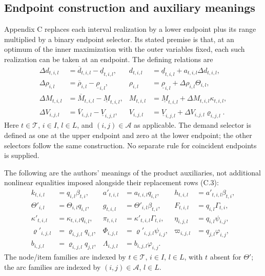 \documentclass{article}
\begin{document}
\subsection*{Endpoint construction and auxiliary meanings}
Appendix C replaces each interval realization by a lower endpoint plus its range
multiplied by a binary endpoint selector. Its stated premise is that, at an optimum
of the inner maximization with the outer variables fixed, each such realization can
be taken at an endpoint. The defining relations are
\begin{align*}
\Delta d_{t,i,l}&=\overline d_{t,i,l}-\underline d_{t,i,l},&
d_{t,i,l}&=\underline d_{t,i,l}+a_{t,i,l}\Delta d_{t,i,l},\\
\Delta\rho_{i,l}&=\overline\rho_{i,l}-\underline\rho_{i,l},&
\rho_{i,l}&=\underline\rho_{i,l}+\Delta\rho_{i,l}\Theta_{i,l},\\
\Delta M_{t,i,l}&=\overline M_{t,i,l}-\underline M_{t,i,l},&
M_{t,i,l}&=\underline M_{t,i,l}+\Delta M_{t,i,l}\kappa_{t,i,l},\\
\Delta V_{i,j,l}&=\overline V_{i,j,l}-\underline V_{i,j,l},&
V_{i,j,l}&=\underline V_{i,j,l}+\Delta V_{i,j,l}\varrho_{i,j,l}.
\end{align*}
Here $t\in\mathcal T$, $i\in I$, $l\in L$, and $(i,j)\in\mathcal A$ as applicable.
The demand selector is defined as one at the upper endpoint and zero at the lower
endpoint; the other selectors follow the same construction. No separate rule for
coincident endpoints is supplied.

The following are the authors' meanings of the product auxiliaries, not additional
nonlinear equalities imposed alongside their replacement rows (C.3):
\begin{align*}
k_{t,i,l}&=q_{i,l}\beta_{t,i},&
a'_{t,i,l}&=a_{t,i,l}q_{i,l},&
h_{t,i,l}&=a'_{t,i,l}\beta_{t,i},\\
\Theta'_{i,l}&=\Theta_{i,l}q_{i,l},&
g_{t,i,l}&=\Theta'_{i,l}\beta_{t,i},&
F_{t,i,l}&=q_{i,l}\Gamma_{t,i},\\
\kappa'_{t,i,l}&=\kappa_{t,i,l}q_{i,l},&
\pi_{t,i,l}&=\kappa'_{t,i,l}\Gamma_{t,i},&
\eta_{i,j,l}&=q_{i,l}\psi_{i,j},\\
\varrho'_{i,j,l}&=\varrho_{i,j,l}q_{i,l},&
\Phi_{i,j,l}&=\varrho'_{i,j,l}\psi_{i,j},&
\varpi_{i,j,l}&=q_{j,l}\varphi_{i,j},\\
b_{i,j,l}&=\varrho_{i,j,l}q_{j,l},&
\Lambda_{i,j,l}&=b_{i,j,l}\varphi_{i,j}.&&
\end{align*}
The node/item families are indexed by $t\in\mathcal T$, $i\in I$, $l\in L$,
with $t$ absent for $\Theta'$; the arc families are indexed by
$(i,j)\in\mathcal A$, $l\in L$.
\end{document}
